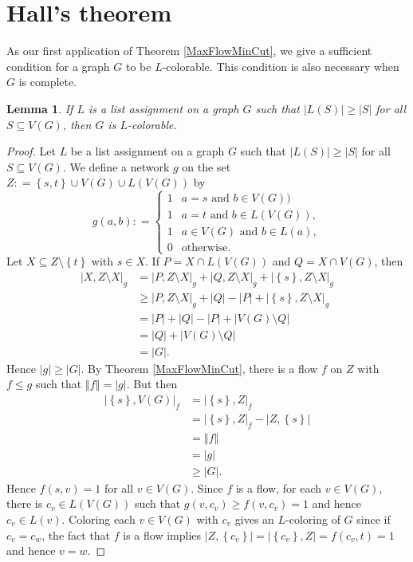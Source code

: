 \documentclass{tufte-book} %
\theoremstyle{plain}
\newtheorem{lemma}{Lemma}
\newcommand{\set}[1]{\left\{ #1 \right\}}
\newcommand{\card}[1]{\left|#1\right|}
\newcommand{\size}[1]{\left\Vert#1\right\Vert}
\newcommand{\DefinedAs}{\mathrel{\mathop:}=}
\begin{document}
\section{Hall's theorem}
As our first application of Theorem \ref{MaxFlowMinCut}, we give a sufficient condition for a graph $G$ to be $L$-colorable.  This 
condition is also necessary when $G$ is complete.
\begin{lemma}
If $L$ is a list assignment on a graph $G$ such that $\card{L(S)} \ge \card{S}$ for all $S \subseteq V(G)$, then $G$ is $L$-colorable.
\end{lemma}
\begin{proof}
Let $L$ be a list assignment on a graph $G$ such that $\card{L(S)} \ge \card{S}$ for all $S \subseteq V(G)$.  
We define a network $g$ on the set $Z \DefinedAs \set{s,t} \cup V(G) \cup L(V(G))$ by
\[g(a, b) \DefinedAs  \begin{cases} 
      1 & a = s \text{ and } b \in  V(G))\\
      1 & a = t \text{ and } b \in  L(V(G)),\\
	  1 & a \in V(G) \text{ and } b \in L(a),\\
      0 & \text{otherwise} .
   \end{cases}
\]
Let $X \subseteq Z \setminus \set{t}$ with $s \in X$.  If $P = X \cap L(V(G))$ and $Q = X \cap V(G)$, then
\begin{align*}
\card{X, Z\setminus X}_g &= \card{P, Z\setminus X}_g + \card{Q, Z\setminus X}_g + \card{\set{s}, Z\setminus X}_g\\
&\ge \card{P, Z\setminus X}_g + \card{Q} - \card{P} + \card{\set{s}, Z\setminus X}_g\\
&=\card{P} + \card{Q} - \card{P} + \card{V(G)\setminus Q}\\
&=\card{Q} + \card{V(G)\setminus Q}\\
&= \card{G}.
\end{align*}
Hence $\card{g} \ge \card{G}$.  By Theorem \ref{MaxFlowMinCut}, there is a flow $f$ on $Z$ with $f \le g$ such that $\size{f} = \card{g}$.  But then
\begin{align*}
\card{\set{s}, V(G)}_f &=  \card{\set{s}, Z}_f \\
&= \card{\set{s}, Z}_f - \card{Z, \set{s}}\\
&=\size{f}\\
&= \card{g}\\
&\ge\card{G}.
\end{align*}
Hence $f(s,v) = 1$ for all $v \in V(G)$.  Since $f$ is a flow, for each $v \in V(G)$, there is $c_v \in L(V(G))$ such that $g(v, c_v) \ge f(v, c_v) = 1$ and hence $c_v \in L(v)$.
Coloring each $v \in V(G)$ with $c_v$ gives an $L$-coloring of $G$ since if $c_v = c_w$, the fact that $f$ is a flow implies 
$\card{Z, \set{c_v}} = \card{\set{c_v}, Z} = f(c_v, t) = 1$ and hence $v = w$.
\end{proof}
\end{document}
